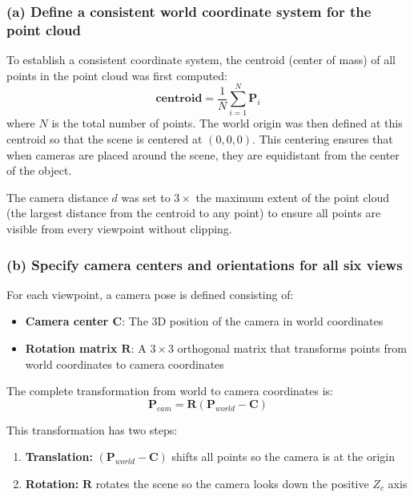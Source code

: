 \documentclass[12pt]{article}
\begin{document}
\subsubsection*{(a) Define a consistent world coordinate system for the point cloud}

To establish a consistent coordinate system, the centroid (center of mass) of all points in the point cloud was first computed:
\[
\mathbf{centroid} = \frac{1}{N} \sum_{i=1}^{N} \mathbf{P}_i
\]
where $N$ is the total number of points. The world origin was then defined at this centroid so that the scene is centered at $(0, 0, 0)$. This centering ensures that when cameras are placed around the scene, they are equidistant from the center of the object.

The camera distance $d$ was set to $3 \times$ the maximum extent of the point cloud (the largest distance from the centroid to any point) to ensure all points are visible from every viewpoint without clipping.

\subsubsection*{(b) Specify camera centers and orientations for all six views}

For each viewpoint, a camera pose is defined consisting of:
\begin{itemize}
    \item \textbf{Camera center $\mathbf{C}$}: The 3D position of the camera in world coordinates
    \item \textbf{Rotation matrix $\mathbf{R}$}: A $3 \times 3$ orthogonal matrix that transforms points from world coordinates to camera coordinates
\end{itemize}

The complete transformation from world to camera coordinates is:
\begin{equation}
    \mathbf{P}_{cam} = \mathbf{R}(\mathbf{P}_{world} - \mathbf{C})
\end{equation}

This transformation has two steps:
\begin{enumerate}
    \item \textbf{Translation:} $(\mathbf{P}_{world} - \mathbf{C})$ shifts all points so the camera is at the origin
    \item \textbf{Rotation:} $\mathbf{R}$ rotates the scene so the camera looks down the positive $Z_c$ axis
\end{enumerate}
\end{document}
